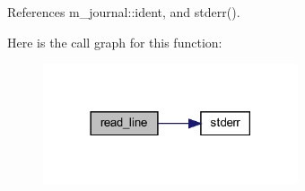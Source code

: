 References m\+\_\+journal\+::ident, and stderr().

Here is the call graph for this function\+:
\nopagebreak
\begin{figure}[H]
\begin{center}
\leavevmode
\includegraphics[width=213pt]{C-read__line_8c_aa70fff09f4f198b81612596f3c466af1_cgraph}
\end{center}
\end{figure}
